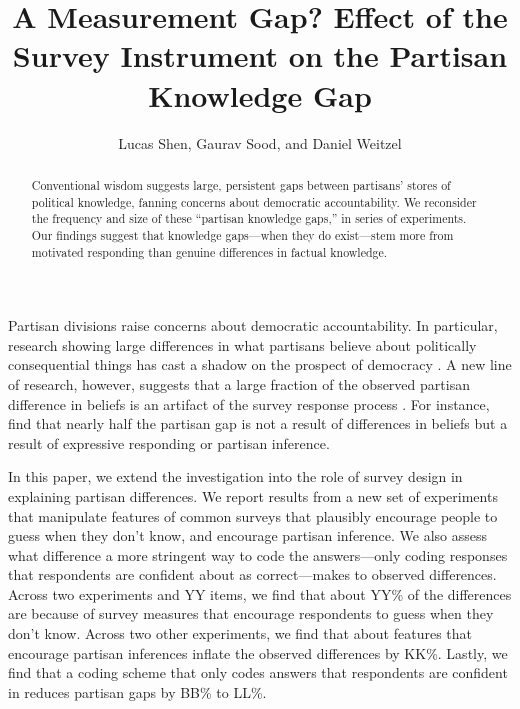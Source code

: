 \documentclass[12pt, letterpaper]{article}
\title{A Measurement Gap? Effect of the Survey Instrument on the Partisan Knowledge Gap}
\author{Lucas Shen, Gaurav Sood, and Daniel Weitzel}
\begin{document}
\maketitle
\thispagestyle{empty}

\begin{abstract}

\noindent Conventional wisdom suggests large, persistent gaps between partisans' stores of political knowledge, fanning concerns about democratic accountability. We reconsider the frequency and size of these ``partisan knowledge gaps,'' in  series of experiments. Our findings suggest that knowledge gaps---when they do exist---stem more from motivated responding than genuine differences in factual knowledge.

\end{abstract}

\vspace{.2in}

\newpage

\doublespacing


Partisan divisions raise concerns about democratic accountability. In particular, research showing large differences in what partisans believe about politically consequential things has cast a shadow on the prospect of democracy \citep{bartels_2002,jerit2012partisan}. A new line of research, however, suggests that a large fraction of the observed partisan difference in beliefs is an artifact of the survey response process \citep{bullocketal_2015,huber_yair_2018, prior2015you}. For instance, \cite{bullocketal_2015} find that nearly half the partisan gap is not a result of differences in beliefs but a result of expressive responding or partisan inference. 

In this paper, we extend the investigation into the role of survey design in explaining partisan differences. We report results from a new set of experiments that manipulate features of common surveys that plausibly encourage people to guess when they don't know, and encourage partisan inference. We also assess what difference a more stringent way to code the answers---only coding responses that respondents are confident about as correct---makes to observed differences. Across two experiments and YY items, we find that about YY\% of the differences are because of survey measures that encourage respondents to guess when they don't know. Across two other experiments, we find that about features that encourage partisan inferences inflate the observed differences by KK\%. Lastly, we find that a coding scheme that only codes answers that respondents are confident in reduces partisan gaps by BB\% to LL\%.
\end{document}
